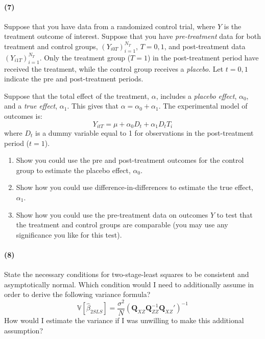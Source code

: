 \documentclass[12pt]{article}
\newcommand\BB{\mathbb}
\newcommand\h{\hat}
\numberwithin{equation}{section}
\numberwithin{figure}{section}
\numberwithin{table}{section}
\begin{document}
\paragraph{(7)} Suppose that you have data from a randomized control trial, where $Y$ is the treatment outcome of interest. Suppose that you have \emph{pre-treatment} data for both treatment and control groups, $(Y_{i0T})_{i=1}^{N_T}$, $T=0,1$, and post-treatment data $(Y_{i1T})_{i=1}^{N_T}$. Only the treatment group ($T=1$) in the post-treatment period have received the treatment, while the control group receives a \emph{placebo}. Let $t=0,1$ indicate the pre and post-treatment periods.

Suppose that the total effect of the treatment, $\alpha$, includes a \emph{placebo effect}, $\alpha_0$, and a \emph{true effect}, $\alpha_1$. This gives that $\alpha = \alpha_0 + \alpha_1$. The experimental model of outcomes is:
\[ Y_{itT} = \mu + \alpha_0D_t + \alpha_1 D_tT_{i} \]
where $D_t$ is a dummy variable equal to 1 for observations in the post-treatment period ($t=1$).
\begin{enumerate}
\item Show you could use the pre and post-treatment outcomes for the control group to estimate the placebo effect, $\alpha_0$.
\item Show how you could use difference-in-differences to estimate the true effect, $\alpha_1$.
\item Show how you could use the pre-treatment data on outcomes $Y$ to test that the treatment and control groups are comparable (you may use any significance you like for this test).
\end{enumerate}

\paragraph{(8)} State the necessary conditions for two-stage-least squares to be consistent and asymptotically normal. Which condition would I need to additionally assume in order to derive the following variance formula?
\[ \BB{V}[\h{\beta}_{2SLS}] = \frac{\sigma^2}{N}(\mathbf{Q}_{XZ}\mathbf{Q}_{ZZ}^{-1}\mathbf{Q}_{XZ}')^{-1} \]
How would I estimate the variance if I was unwilling to make this additional assumption?
\end{document}
